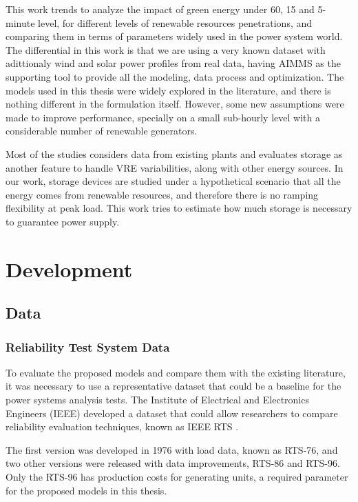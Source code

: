 \documentclass[12pt,LUDisStyle,twosided]{book}
\begin{document}
This work trends to analyze the impact of green energy under 60, 15 and 5-minute level, for different levels of renewable resources penetrations, and comparing them in terms of parameters widely used in the power system world. The differential in this work is that we are using a very known dataset with adittionaly wind and solar power profiles from real data, having AIMMS as the supporting tool to provide all the modeling, data process and optimization. The models used in this thesis were widely explored in the literature, and there is nothing different in the formulation itself. However, some new assumptions were made to improve performance, specially on a small sub-hourly level with a considerable number of renewable generators.

Most of the studies considers data from existing plants and evaluates storage as another feature to handle VRE variabilities, along with other energy sources. In our work, storage devices are studied under a hypothetical scenario that all the energy comes from renewable resources, and therefore there is no ramping flexibility at peak load. This work tries to estimate how much storage is necessary to guarantee power supply.

\chapter{Development}
\section{Data}

\subsection{Reliability Test System Data}

To evaluate the proposed models and compare them with the existing literature, it was necessary to use a representative dataset that could be a baseline for the power systems analysis tests. The Institute of Electrical and Electronics Engineers (IEEE) developed a dataset that could allow researchers to compare reliability evaluation techniques, known as IEEE RTS \cite{wongieee}. 

The first version was developed in 1976 with load data, known as RTS-76, and two other versions were released with data improvements, RTS-86 and RTS-96. Only the RTS-96 has production costs for generating units, a required parameter for the proposed models in this thesis.
\end{document}
